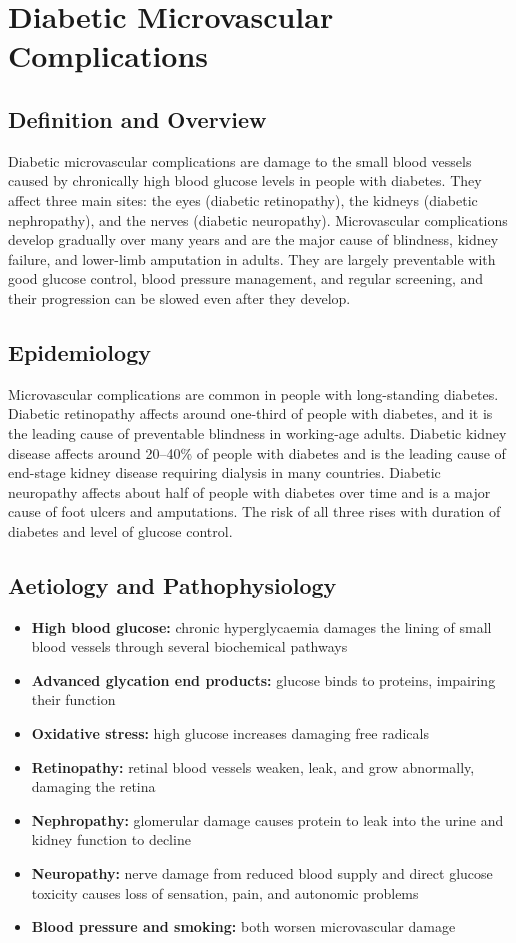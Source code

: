 \chapter{Diabetic Microvascular Complications}

\section*{Definition and Overview}
Diabetic microvascular complications are damage to the small blood vessels caused by chronically high blood glucose levels in people with diabetes. They affect three main sites: the eyes (diabetic retinopathy), the kidneys (diabetic nephropathy), and the nerves (diabetic neuropathy). Microvascular complications develop gradually over many years and are the major cause of blindness, kidney failure, and lower-limb amputation in adults. They are largely preventable with good glucose control, blood pressure management, and regular screening, and their progression can be slowed even after they develop.

\section*{Epidemiology}
Microvascular complications are common in people with long-standing diabetes. Diabetic retinopathy affects around one-third of people with diabetes, and it is the leading cause of preventable blindness in working-age adults. Diabetic kidney disease affects around 20--40\% of people with diabetes and is the leading cause of end-stage kidney disease requiring dialysis in many countries. Diabetic neuropathy affects about half of people with diabetes over time and is a major cause of foot ulcers and amputations. The risk of all three rises with duration of diabetes and level of glucose control.

\section*{Aetiology and Pathophysiology}
\begin{itemize}
    \item \textbf{High blood glucose:} chronic hyperglycaemia damages the lining of small blood vessels through several biochemical pathways
    \item \textbf{Advanced glycation end products:} glucose binds to proteins, impairing their function
    \item \textbf{Oxidative stress:} high glucose increases damaging free radicals
    \item \textbf{Retinopathy:} retinal blood vessels weaken, leak, and grow abnormally, damaging the retina
    \item \textbf{Nephropathy:} glomerular damage causes protein to leak into the urine and kidney function to decline
    \item \textbf{Neuropathy:} nerve damage from reduced blood supply and direct glucose toxicity causes loss of sensation, pain, and autonomic problems
    \item \textbf{Blood pressure and smoking:} both worsen microvascular damage
\end{itemize}


